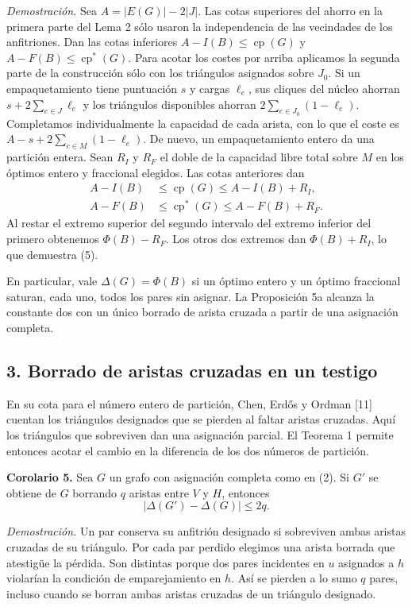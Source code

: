 \documentclass[spanish,11pt,a4paper]{article}
\begin{document}
\emph{Demostración.} Sea \(A=|E(G)|-2|J|\). Las cotas superiores del ahorro en la primera parte del Lema 2 sólo usaron la independencia de las vecindades de los anfitriones. Dan las cotas inferiores \(A-I(B)\le\operatorname{cp}(G)\) y \(A-F(B)\le\operatorname{cp}^{\ast}(G)\). Para acotar los costes por arriba aplicamos la segunda parte de la construcción sólo con los triángulos asignados sobre \(J_0\). Si un empaquetamiento tiene puntuación \(s\) y cargas \(\ell_e\), sus cliques del núcleo ahorran \(s+2\sum_{e\in J}\ell_e\) y los triángulos disponibles ahorran \(2\sum_{e\in J_0}(1-\ell_e)\). Completamos individualmente la capacidad de cada arista, con lo que el coste es \(A-s+2\sum_{e\in M}(1-\ell_e)\). De nuevo, un empaquetamiento entero da una partición entera. Sean \(R_I\) y \(R_F\) el doble de la capacidad libre total sobre \(M\) en los óptimos entero y fraccional elegidos. Las cotas anteriores dan \[
\begin{aligned}
A-I(B)&\le\operatorname{cp}(G)\le A-I(B)+R_I,\\
A-F(B)&\le\operatorname{cp}^{\ast}(G)\le A-F(B)+R_F.
\end{aligned}
\] Al restar el extremo superior del segundo intervalo del extremo inferior del primero obtenemos \(\Phi(B)-R_F\). Los otros dos extremos dan \(\Phi(B)+R_I\), lo que demuestra (5).

En particular, vale \(\Delta(G)=\Phi(B)\) si un óptimo entero y un óptimo fraccional saturan, cada uno, todos los pares sin asignar. La Proposición 5a alcanza la constante dos con un único borrado de arista cruzada a partir de una asignación completa.

\subsection{3. Borrado de aristas cruzadas en un testigo}\label{borrado-de-aristas-cruzadas-en-un-testigo}

En su cota para el número entero de partición, Chen, Erdős y Ordman {[}11{]} cuentan los triángulos designados que se pierden al faltar aristas cruzadas. Aquí los triángulos que sobreviven dan una asignación parcial. El Teorema 1 permite entonces acotar el cambio en la diferencia de los dos números de partición.

\textbf{Corolario 5.} Sea \(G\) un grafo con asignación completa como en (2). Si \(G'\) se obtiene de \(G\) borrando \(q\) aristas entre \(V\) y \(H\), entonces
\[
|\Delta(G')-\Delta(G)|\le 2q. \tag{6}
\]

\emph{Demostración.} Un par conserva su anfitrión designado si sobreviven ambas aristas cruzadas de su triángulo. Por cada par perdido elegimos una arista borrada que atestigüe la pérdida. Son distintas porque dos pares incidentes en \(u\) asignados a \(h\) violarían la condición de emparejamiento en \(h\). Así se pierden a lo sumo \(q\) pares, incluso cuando se borran ambas aristas cruzadas de un triángulo designado.
\end{document}
